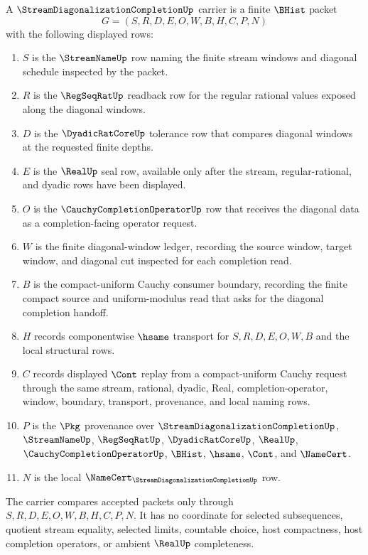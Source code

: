\begin{definition}
\label{def:stream-diagonalization-completion-carrier}
A $\StreamDiagonalizationCompletionUp$ carrier is a finite $\BHist$ packet
$$
G=(S,R,D,E,O,W,B,H,C,P,N)
$$
with the following displayed rows:
\begin{enumerate}
\item $S$ is the $\StreamNameUp$ row naming the finite stream windows and diagonal schedule inspected by the packet.
\item $R$ is the $\RegSeqRatUp$ readback row for the regular rational values exposed along the diagonal windows.
\item $D$ is the $\DyadicRatCoreUp$ tolerance row that compares diagonal windows at the requested finite depths.
\item $E$ is the $\RealUp$ seal row, available only after the stream, regular-rational, and dyadic rows have been displayed.
\item $O$ is the $\CauchyCompletionOperatorUp$ row that receives the diagonal data as a completion-facing operator request.
\item $W$ is the finite diagonal-window ledger, recording the source window, target window, and diagonal cut inspected for each completion read.
\item $B$ is the compact-uniform Cauchy consumer boundary, recording the finite compact source and uniform-modulus read that asks for the diagonal completion handoff.
\item $H$ records componentwise $\hsame$ transport for $S,R,D,E,O,W,B$ and the local structural rows.
\item $C$ records displayed $\Cont$ replay from a compact-uniform Cauchy request through the same stream, rational, dyadic, Real, completion-operator, window, boundary, transport, provenance, and local naming rows.
\item $P$ is the $\Pkg$ provenance over $\StreamDiagonalizationCompletionUp$, $\StreamNameUp$, $\RegSeqRatUp$, $\DyadicRatCoreUp$, $\RealUp$, $\CauchyCompletionOperatorUp$, $\BHist$, $\hsame$, $\Cont$, and $\NameCert$.
\item $N$ is the local $\NameCert_{\StreamDiagonalizationCompletionUp}$ row.
\end{enumerate}
The carrier compares accepted packets only through $S,R,D,E,O,W,B,H,C,P,N$. It has no coordinate for selected subsequences, quotient stream equality, selected limits, countable choice, host compactness, host completion operators, or ambient $\RealUp$ completeness.
\end{definition}

